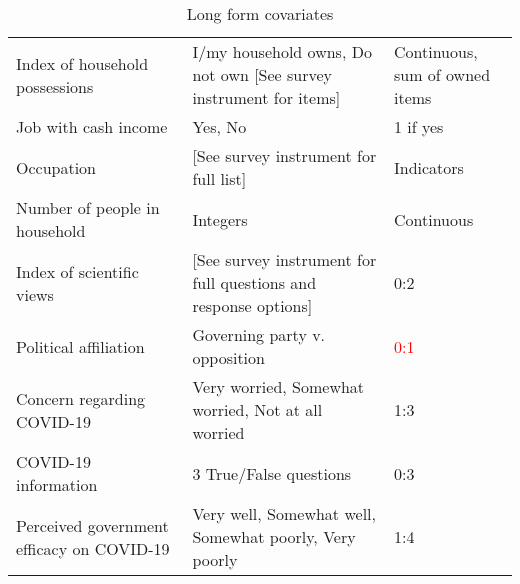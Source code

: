 \begin{table}[H]
\begin{tabular}{p{0.35\linewidth}p{0.4\linewidth}p{0.25\linewidth}}
Index of household possessions%
&
  I/my household owns, Do not own [See survey instrument for items] &
  Continuous, sum of owned items \\
Job   with cash income                      & Yes,   No                                                  & 1 if yes                \\
Occupation                                  & {[}See   survey instrument for full list{]}                & Indicators              \\
Number   of people in household             & Integers                                                   & Continuous              \\
Index   of scientific views                 & {[}See   survey instrument for full questions and response options{]} & 0:2                     \\
Political affiliation & Governing party v. opposition & \textcolor{red}{0:1}\\
Concern regarding COVID-19                  & Very   worried, Somewhat worried, Not at all worried       & 1:3                     \\
COVID-19 information & 3 True/False questions & 0:3\\
Perceived government efficacy   on COVID-19 & Very   well, Somewhat well, Somewhat poorly, Very poorly   & 1:4                    
\end{tabular}
\caption{Long form covariates}
\label{cov_long}
\end{table}